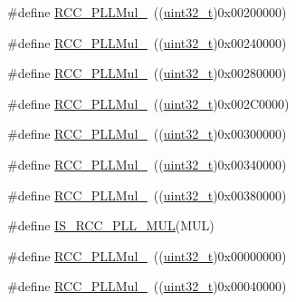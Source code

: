 \begin{DoxyCompactItemize}
\item 
\#define \hyperlink{group___p_l_l__multiplication__factor_ga572881d8c1e6c5b635198b286a2f4087}{R\+C\+C\+\_\+\+P\+L\+L\+Mul\+\_}~((\hyperlink{_p_e___types_8h_a33594304e786b158f3fb30289278f5af}{uint32\+\_\+t})0x00200000)
\item 
\#define \hyperlink{group___p_l_l__multiplication__factor_ga15da9e109b8556e96bdb9543347366c9}{R\+C\+C\+\_\+\+P\+L\+L\+Mul\+\_}~((\hyperlink{_p_e___types_8h_a33594304e786b158f3fb30289278f5af}{uint32\+\_\+t})0x00240000)
\item 
\#define \hyperlink{group___p_l_l__multiplication__factor_ga5c6729e9c63b3e84d1a86a6b0f571f88}{R\+C\+C\+\_\+\+P\+L\+L\+Mul\+\_}~((\hyperlink{_p_e___types_8h_a33594304e786b158f3fb30289278f5af}{uint32\+\_\+t})0x00280000)
\item 
\#define \hyperlink{group___p_l_l__multiplication__factor_ga78b3638b79c30920c09f18206daafc7a}{R\+C\+C\+\_\+\+P\+L\+L\+Mul\+\_}~((\hyperlink{_p_e___types_8h_a33594304e786b158f3fb30289278f5af}{uint32\+\_\+t})0x002\+C0000)
\item 
\#define \hyperlink{group___p_l_l__multiplication__factor_ga457e11adfe1e815eeb5f38de61a94328}{R\+C\+C\+\_\+\+P\+L\+L\+Mul\+\_}~((\hyperlink{_p_e___types_8h_a33594304e786b158f3fb30289278f5af}{uint32\+\_\+t})0x00300000)
\item 
\#define \hyperlink{group___p_l_l__multiplication__factor_gaad1fbc2e251391b4c469e39ccf05d642}{R\+C\+C\+\_\+\+P\+L\+L\+Mul\+\_}~((\hyperlink{_p_e___types_8h_a33594304e786b158f3fb30289278f5af}{uint32\+\_\+t})0x00340000)
\item 
\#define \hyperlink{group___p_l_l__multiplication__factor_ga98118a80e57ed822485df8a8bef3cb1f}{R\+C\+C\+\_\+\+P\+L\+L\+Mul\+\_}~((\hyperlink{_p_e___types_8h_a33594304e786b158f3fb30289278f5af}{uint32\+\_\+t})0x00380000)
\item 
\#define \hyperlink{group___p_l_l__multiplication__factor_gaad04edea77632618678f528dcb2b0cd5}{I\+S\+\_\+\+R\+C\+C\+\_\+\+P\+L\+L\+\_\+\+M\+UL}(M\+UL)
\item 
\#define \hyperlink{group___p_l_l__multiplication__factor_ga91b3b28fa4d56693d1eb361e24f317af}{R\+C\+C\+\_\+\+P\+L\+L\+Mul\+\_}~((\hyperlink{_p_e___types_8h_a33594304e786b158f3fb30289278f5af}{uint32\+\_\+t})0x00000000)
\item 
\#define \hyperlink{group___p_l_l__multiplication__factor_gafc2dd6c503b9ee6e0cfbec6d7d3a3e00}{R\+C\+C\+\_\+\+P\+L\+L\+Mul\+\_}~((\hyperlink{_p_e___types_8h_a33594304e786b158f3fb30289278f5af}{uint32\+\_\+t})0x00040000)

\end{DoxyCompactItemize}
